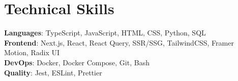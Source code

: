 \section{Technical Skills}
    \begin{itemize}[leftmargin=0.15in, label={}]
	\small{\item{
		\textbf{Languages}{: TypeScript, JavaScript, HTML, CSS, Python, SQL} \\
		\textbf{Frontend}{: Next.js, React, React Query, SSR/SSG, TailwindCSS, Framer Motion, Radix UI} \\
		\textbf{DevOps}{: Docker, Docker Compose, Git, Bash} \\
		\textbf{Quality}{: Jest, ESLint, Prettier}
	}}
    \end{itemize}
